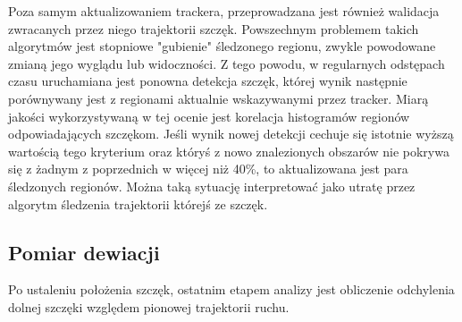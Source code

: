 Poza samym aktualizowaniem trackera, przeprowadzana jest również walidacja zwracanych przez niego trajektorii szczęk. Powszechnym problemem takich algorytmów jest stopniowe "gubienie" śledzonego regionu, zwykle powodowane zmianą jego wyglądu lub widoczności. Z tego powodu, w regularnych odstępach czasu uruchamiana jest ponowna detekcja szczęk, której wynik następnie porównywany jest z regionami aktualnie wskazywanymi przez tracker. Miarą jakości wykorzystywaną w tej ocenie jest korelacja histogramów regionów odpowiadających szczękom. Jeśli wynik nowej detekcji cechuje się istotnie wyższą wartością tego kryterium oraz któryś z nowo znalezionych obszarów nie pokrywa się z żadnym z poprzednich w więcej niż 40\%, to aktualizowana jest para śledzonych regionów. Można taką sytuację interpretować jako utratę przez algorytm śledzenia trajektorii którejś ze szczęk.

\subsection{Pomiar dewiacji}

Po ustaleniu położenia szczęk, ostatnim etapem analizy jest obliczenie odchylenia dolnej szczęki względem pionowej trajektorii ruchu.